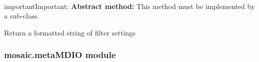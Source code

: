 \documentclass[letterpaper,10pt,english]{sphinxmanual}
\begin{document}
\begin{fulllineitems}

\begin{fulllineitems}
\label{api-doc/mosaic.meta:mosaic.metaIOFilter.metaIOFilter.formatsettings}~
\begin{notice}{important}{Important:}
\textbf{Abstract method:} This method must be implemented by a sub-class.
\end{notice}

Return a formatted string of filter settings

\end{fulllineitems}


\end{fulllineitems}



\subsubsection{mosaic.metaMDIO module}
\label{api-doc/mosaic.meta:mosaic-metamdio-module}
\end{document}

